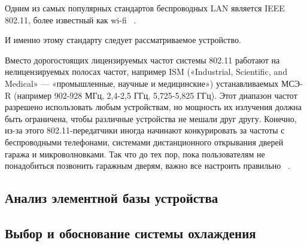 Одним из самых популярных стандартов беспроводных LAN является IEEE
802.11, более известный как wi-fi ~\cite{NetworksTanenbaum2023}.

И именно этому стандарту следует рассматриваемое устройство.

Вместо дорогостоящих лицензируемых частот системы 802.11 работают на
нелицензируемых полосах частот, например ISM («Industrial, Scientific,
and Medical» — «промышленные, научные и медицинские») устанавливаемых
МСЭ-R (например 902-928 МГц, 2,4-2,5 ГГц, 5,725-5,825 ГГц).  Этот
диапазон частот разрешено использовать любым устройствам, но мощность
их излучения должна быть ограничена, чтобы различные устройства не
мешали друг другу. Конечно, из-за этого 802.11-передатчики иногда
начинают конкурировать за частоты с беспроводными телефонами,
системами дистанционного открывания дверей гаража и микроволновками.
Так что до тех пор, пока пользователям не понадобиться позвонить
гаражным дверям, важно все настроить правильно ~\cite{NetworksTanenbaum2023}.



\subsection{Анализ элементной базы устройства}
\subsection{Выбор и обоснование системы охлаждения}

\newpage